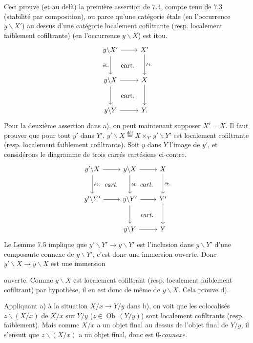 \documentclass[11pt]{article}
\newcommand{\printedpage}[1]{\marginpar{\footnotesize p.~#1}}
\def\dcprintedpending{}
\newcommand{\msp}[1]{\marginpar{\footnotesize\raggedright
  \ifx\dcprintedpending\empty\else p.~\dcprintedpending\par\fi
  [#1]}\gdef\dcprintedpending{}}
\newcommand{\Ob}{\operatorname{Ob}}
\newcommand{\margmark}[1]{\marginpar{\footnotesize #1}}
\begin{document}
Ceci prouve (et au delà) la première assertion de 7.4, compte tenu de 7.3 (stabilité par composition), ou parce qu'une \msp{page 94} catégorie étale (en l'occurrence $y\backslash X'$) au dessus d'une catégorie localement cofiltrante (resp. localement faiblement cofiltrante) (en l'occurrence $y\backslash X$) est itou.
\[
\begin{tikzcd}[row sep=large]
y\backslash X' \arrow[r] \arrow[d, "\text{ét.}"'] \arrow[dr, phantom, "\text{cart.}"] & X' \arrow[d, "\text{ét.}"] \\
y\backslash X \arrow[r] \arrow[d] \arrow[dr, phantom, "\text{cart.}"] & X \arrow[d] \\
y\backslash Y \arrow[r] & Y.
\end{tikzcd}
\]
Pour la deuxième assertion dans a), on peut maintenant supposer $X' = X$. Il faut prouver que pour tout $y'$ dans $Y'$, $y'\backslash X \overset{\text{déf}}{=} X \times_{Y'} y'\backslash Y'$ est localement cofiltrante (resp. localement faiblement cofiltrante). Soit $y$ dans $Y$ l'image de $y'$, et considérons le diagramme de trois carrés cartésiens ci-contre.
\[
\begin{tikzcd}[row sep=large]
y'\backslash X \arrow[r] \arrow[d, "\text{ét.}"] \arrow[dr, phantom, "\textit{cart.}"] & y\backslash X \arrow[r] \arrow[d, "\text{ét.}"] \arrow[dr, phantom, "\textit{cart.}"] & X \arrow[d, "\text{ét.}"] \\
y'\backslash Y' \arrow[r] & y\backslash Y' \arrow[r] \arrow[d] \arrow[dr, phantom, "\textit{cart.}"] & Y' \arrow[d] \\
 & y\backslash Y \arrow[r] & Y
\end{tikzcd}
\]
Le Lemme 7.5 implique que $y'\backslash Y' \longrightarrow y\backslash Y'$ est l'inclusion dans $y\backslash Y'$ d'une composante connexe de $y\backslash Y'$, c'est donc une immersion ouverte. Donc $y'\backslash X \longrightarrow y\backslash X$ est une immersion

\printedpage{59}

ouverte. Comme $y\backslash X$ est localement cofiltrant (resp. localement faiblement cofiltrant) par hypothèse, il en est donc de même de $y\backslash X$. Cela prouve d).

Appliquant a) à la situation $X/x \longrightarrow Y/y$ dans b), on voit que les colocalisés $z\backslash(X/x)$ de
\margmark{!} %
$X/x$ sur $Y/y$ ($z \in \Ob\,(Y/y)$) sont localement cofiltrants (resp. faiblement). Mais comme $X/x$ a un objet final au dessus de l'objet final de $Y/y$, il s'ensuit que $z\backslash(X/x)$ a un objet final, donc est $0$-\textit{connexe.}
\end{document}
